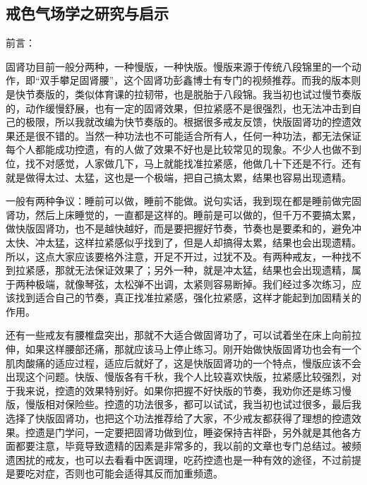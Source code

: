 \subsection{戒色气场学之研究与启示}

前言：

固肾功目前一般分两种，一种慢版，一种快版。慢版来源于传统八段锦里的一个动作，即“双手攀足固肾腰”，这个固肾功彭鑫博士有专门的视频推荐。而我的版本则是快节奏版的，类似体育课的拉韧带，也是脱胎于八段锦。我当初也试过慢节奏版的，动作缓慢舒展，也有一定的固肾效果，但拉紧感不是很强烈，也无法冲击到自己的极限，所以我就改编为快节奏版的。根据很多戒友反馈，快版固肾功的控遗效果还是很不错的。当然一种功法也不可能适合所有人，任何一种功法，都无法保证每个人都能成功控遗，有的人做了效果不好也是比较常见的现象。不少人也做不到位，找不对感觉，人家做几下，马上就能找准拉紧感，他做几十下还是不行。还有就是做得太过、太猛，这也是一个极端，把自己搞太累，结果也容易出现遗精。

一般有两种争议：睡前可以做，睡前不能做。说句实话，我到现在都是睡前做完固肾功，然后上床睡觉的，一直都是这样的。睡前是可以做的，但千万不要搞太累，做快版固肾功，也不是越快越好，而是要把握好节奏，节奏也是要柔和的，避免冲太快、冲太猛，这样拉紧感似乎找到了，但是人却搞得太累，结果也会出现遗精。所以，这点大家应该要格外注意，开足不开过，过犹不及。有两种戒友，一种找不到拉紧感，那就无法保证效果了；另外一种，就是冲太猛，结果也会出现遗精，属于两种极端，就像琴弦，太松弹不出调，太紧则容易断掉。我们经过多次练习，应该找到适合自己的节奏，真正找准拉紧感，强化拉紧感，这样才能起到加固精关的作用。

还有一些戒友有腰椎盘突出，那就不大适合做固肾功了，可以试着坐在床上向前拉伸，如果这样腰部还痛，那就应该马上停止练习。刚开始做快版固肾功也会有一个肌肉酸痛的适应过程，适应后就好了，这是快版固肾功的一个特点，慢版应该不会出现这个问题。快版、慢版各有千秋，我个人比较喜欢快版，拉紧感比较强烈，对于我来说，控遗的效果特别好。如果你把握不好快版的节奏，我劝你还是练习慢版，慢版相对保险些。控遗的功法很多，都可以试试，我当初也试过很多，最后我选择了快版固肾功，也把这个功法推荐给了大家，不少戒友都获得了理想的控遗效果。控遗是门学问，一定要把固肾功做到位，睡姿保持吉祥卧，另外就是其他各方面都要注意，毕竟导致遗精的因素是非常多的，我以前的文章也专门总结过。被频遗困扰的戒友，也可以去看看中医调理，吃药控遗也是一种有效的途径，不过前提是要吃对症，否则也可能会适得其反而加重频遗。

